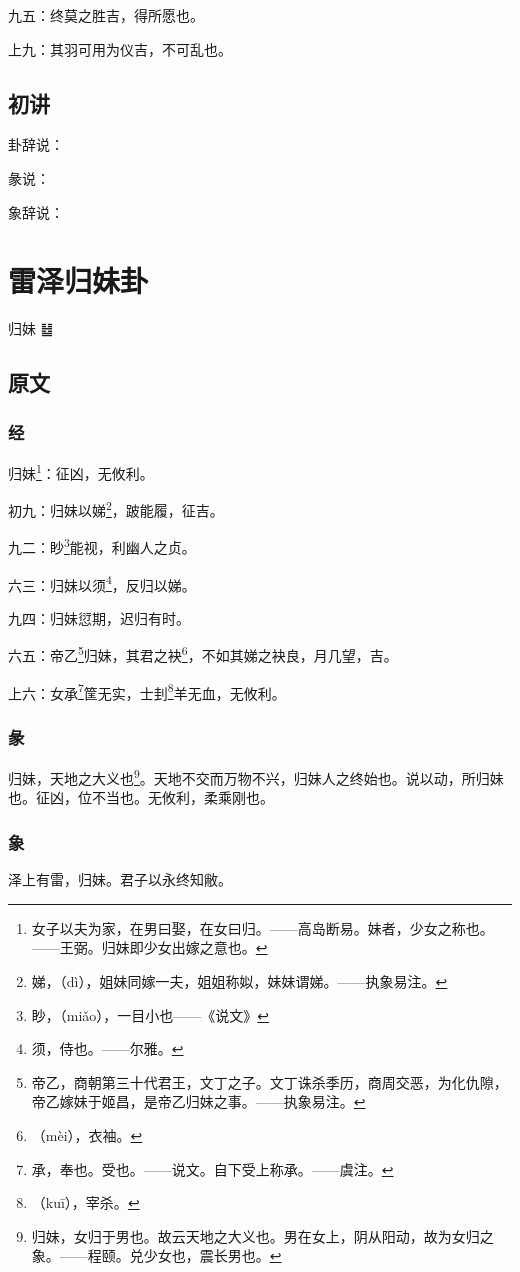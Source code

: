 \documentclass[12pt,oneside]{book}
\begin{document}
九五：终莫之胜吉，得所愿也。

上九：其羽可用为仪吉，不可乱也。


\section{初讲}
卦辞说：

彖说：

象辞说：

\chapter{雷泽归妹卦}
归妹 {\Large ䷵}


\section{原文}

\subsection{经}
归妹\footnote{女子以夫为家，在男曰娶，在女曰归。——高岛断易。妹者，少女之称也。——王弼。归妹即少女出嫁之意也。}：征凶，无攸利。

初九：归妹以娣\footnote{娣，（dì），姐妹同嫁一夫，姐姐称姒，妹妹谓娣。——执象易注。}，跛能履，征吉。

九二：眇\footnote{眇，（miǎo），一目小也——《说文》}能视，利幽人之贞。

六三：归妹以须\footnote{须，侍也。——尔雅。}，反归以娣。

九四：归妹愆期，迟归有时。

六五：帝乙\footnote{帝乙，商朝第三十代君王，文丁之子。文丁诛杀季历，商周交恶，为化仇隙，帝乙嫁妹于姬昌，是帝乙归妹之事。——执象易注。}归妹，其君之袂\footnote{（mèi），衣袖。}，不如其娣之袂良，月几望，吉。

上六：女承\footnote{承，奉也。受也。——说文。自下受上称承。——虞注。}筐无实，士刲\footnote{（kuī），宰杀。}羊无血，无攸利。

\subsection{彖}
归妹，天地之大义也\footnote{归妹，女归于男也。故云天地之大义也。男在女上，阴从阳动，故为女归之象。——程颐。兑少女也，震长男也。}。天地不交而万物不兴，归妹人之终始也。说以动，所归妹也。征凶，位不当也。无攸利，柔乘刚也。

\subsection{象}
泽上有雷，归妹。君子以永终知敝。
\end{document}
